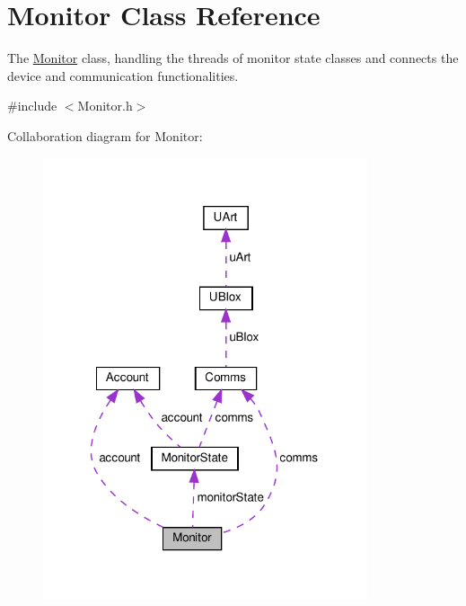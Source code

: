 \hypertarget{class_monitor}{}\section{Monitor Class Reference}
\label{class_monitor}


The \hyperlink{class_monitor}{Monitor} class, handling the threads of monitor state classes and connects the device and communication functionalities.  




{\ttfamily \#include $<$Monitor.\+h$>$}



Collaboration diagram for Monitor\+:\nopagebreak
\begin{figure}[H]
\begin{center}
\leavevmode
\includegraphics[width=271pt]{d0/d9f/class_monitor__coll__graph}
\end{center}
\end{figure}
